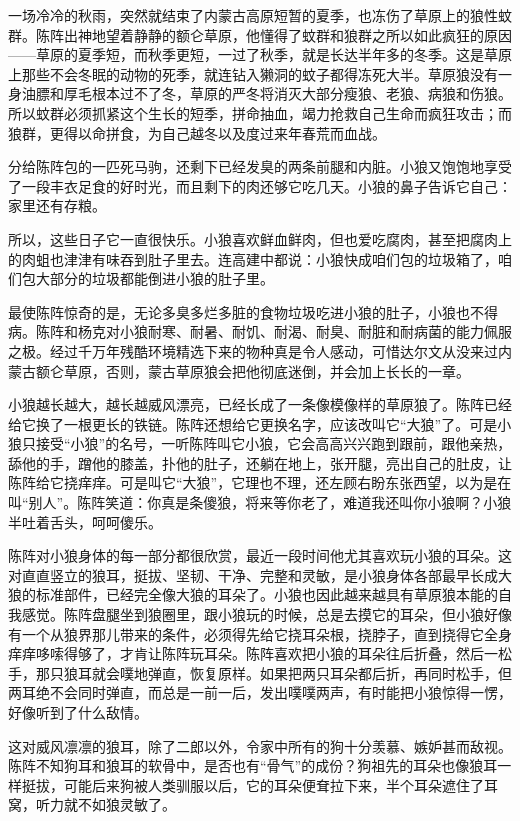\par 一场冷冷的秋雨，突然就结束了内蒙古高原短暂的夏季，也冻伤了草原上的狼性蚊群。陈阵出神地望着静静的额仑草原，他懂得了蚊群和狼群之所以如此疯狂的原因——草原的夏季短，而秋季更短，一过了秋季，就是长达半年多的冬季。这是草原上那些不会冬眠的动物的死季，就连钻入獭洞的蚊子都得冻死大半。草原狼没有一身油膘和厚毛根本过不了冬，草原的严冬将消灭大部分瘦狼、老狼、病狼和伤狼。所以蚊群必须抓紧这个生长的短季，拼命抽血，竭力抢救自己生命而疯狂攻击；而狼群，更得以命拼食，为自己越冬以及度过来年春荒而血战。
\par 分给陈阵包的一匹死马驹，还剩下已经发臭的两条前腿和内脏。小狼又饱饱地享受了一段丰衣足食的好时光，而且剩下的肉还够它吃几天。小狼的鼻子告诉它自己：家里还有存粮。
\par 所以，这些日子它一直很快乐。小狼喜欢鲜血鲜肉，但也爱吃腐肉，甚至把腐肉上的肉蛆也津津有味吞到肚子里去。连高建中都说：小狼快成咱们包的垃圾箱了，咱们包大部分的垃圾都能倒进小狼的肚子里。
\par 最使陈阵惊奇的是，无论多臭多烂多脏的食物垃圾吃进小狼的肚子，小狼也不得病。陈阵和杨克对小狼耐寒、耐暑、耐饥、耐渴、耐臭、耐脏和耐病菌的能力佩服之极。经过千万年残酷环境精选下来的物种真是令人感动，可惜达尔文从没来过内蒙古额仑草原，否则，蒙古草原狼会把他彻底迷倒，并会加上长长的一章。
\par 小狼越长越大，越长越威风漂亮，已经长成了一条像模像样的草原狼了。陈阵已经给它换了一根更长的铁链。陈阵还想给它更换名字，应该改叫它“大狼”了。可是小狼只接受“小狼”的名号，一听陈阵叫它小狼，它会高高兴兴跑到跟前，跟他亲热，舔他的手，蹭他的膝盖，扑他的肚子，还躺在地上，张开腿，亮出自己的肚皮，让陈阵给它挠痒痒。可是叫它“大狼”，它理也不理，还左顾右盼东张西望，以为是在叫“别人”。陈阵笑道：你真是条傻狼，将来等你老了，难道我还叫你小狼啊？小狼半吐着舌头，呵呵傻乐。
\par 陈阵对小狼身体的每一部分都很欣赏，最近一段时间他尤其喜欢玩小狼的耳朵。这对直直竖立的狼耳，挺拔、坚韧、干净、完整和灵敏，是小狼身体各部最早长成大狼的标准部件，已经完全像大狼的耳朵了。小狼也因此越来越具有草原狼本能的自我感觉。陈阵盘腿坐到狼圈里，跟小狼玩的时候，总是去摸它的耳朵，但小狼好像有一个从狼界那儿带来的条件，必须得先给它挠耳朵根，挠脖子，直到挠得它全身痒痒哆嗦得够了，才肯让陈阵玩耳朵。陈阵喜欢把小狼的耳朵往后折叠，然后一松手，那只狼耳就会噗地弹直，恢复原样。如果把两只耳朵都后折，再同时松手，但两耳绝不会同时弹直，而总是一前一后，发出噗噗两声，有时能把小狼惊得一愣，好像听到了什么敌情。
\par 这对威风凛凛的狼耳，除了二郎以外，令家中所有的狗十分羡慕、嫉妒甚而敌视。陈阵不知狗耳和狼耳的软骨中，是否也有“骨气”的成份？狗祖先的耳朵也像狼耳一样挺拔，可能后来狗被人类驯服以后，它的耳朵便耷拉下来，半个耳朵遮住了耳窝，听力就不如狼灵敏了。
